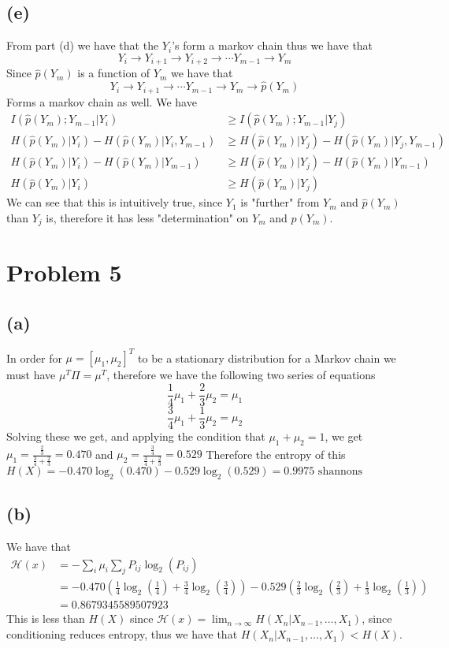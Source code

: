 \subsection*{(e)}
From part (d) we have that the $Y_i$'s form a markov chain
thus we have that 
$$Y_i\rightarrow Y_{i+1}\rightarrow Y_{i+2}\rightarrow \cdots Y_{m-1}\rightarrow Y_m$$
Since $\hat{p}(Y_m)$ is a function of $Y_m$ we have that 
$$Y_i\rightarrow Y_{i+1}\rightarrow \cdots Y_{m-1}\rightarrow Y_m\rightarrow \hat{p}(Y_m)$$
Forms a markov chain as well. We have
\begin{align*}
    I(\hat{p}(Y_m);Y_{m-1}|Y_i)&\geq I(\hat{p}(Y_m);Y_{m-1}|Y_j)\\
    H(\hat{p}(Y_m)|Y_i)-H(\hat{p}(Y_m)|Y_i,Y_{m-1})&\geq H(\hat{p}(Y_m)|Y_j)-H(\hat{p}(Y_m)|Y_j,Y_{m-1})\\
    H(\hat{p}(Y_m)|Y_i)-H(\hat{p}(Y_m)|Y_{m-1})&\geq H(\hat{p}(Y_m)|Y_j)-H(\hat{p}(Y_m)|Y_{m-1})\\
    H(\hat{p}(Y_m)|Y_i)&\geq H(\hat{p}(Y_m)|Y_j)
\end{align*}
We can see that this is intuitively true, since $Y_{1}$ is "further" from 
$Y_{m}$ and $\hat{p}(Y_m)$ than $Y_{j}$ is, therefore it has less 
"determination" on $Y_{m}$ and $\hat{p}(Y_m)$.
\section*{Problem 5}
\subsection*{(a)}
In order for $\mu=[\mu_1,\mu_2]^T$ to be a stationary distribution for 
a Markov chain we must have $\mu^T\Pi=\mu^T$, therefore we have the 
following two series of equations
$$\frac{1}{4}\mu_1+\frac{2}{3}\mu_2=\mu_1$$
$$\frac{3}{4}\mu_1+\frac{1}{3}\mu_2=\mu_2$$
Solving these we get, and applying the condition that $\mu_1+\mu_2=1$,
we get $\mu_1=\frac{\frac{2}{3}}{\frac{3}{4}+\frac{2}{3}}=\boxed{0.470}$ and
$\mu_2=\frac{\frac{3}{4}}{\frac{3}{4}+\frac{2}{3}}=\boxed{0.529}$ Therefore the 
entropy of this $H(X)=-0.470\log_2(0.470)-0.529\log_2(0.529)=\boxed{0.9975\text{ shannons}}$
\subsection*{(b)}
We have that 
\begin{align*}
    \mathcal{H}(x)&=-\sum_{i}\mu_i\sum_{j}P_{ij}\log_2(P_{ij})\\
    &=-0.470\left(\frac{1}{4}\log_2\left(\frac{1}{4}\right)+
    \frac{3}{4}\log_2\left(\frac{3}{4}\right)\right)-0.529\left(\frac{2}{3}\log_2\left(\frac{2}{3}\right)+
    \frac{1}{3}\log_2\left(\frac{1}{3}\right)\right)\\
    &=\boxed{0.8679345589507923}
\end{align*}
This is less than $H(X)$ since 
$\mathcal{H}(x)=\lim_{n\to\infty}H(X_n|X_{n-1},\dots,X_1)$, 
since conditioning reduces entropy, thus we have that 
$H(X_n|X_{n-1},\dots,X_1)<H(X)$.
